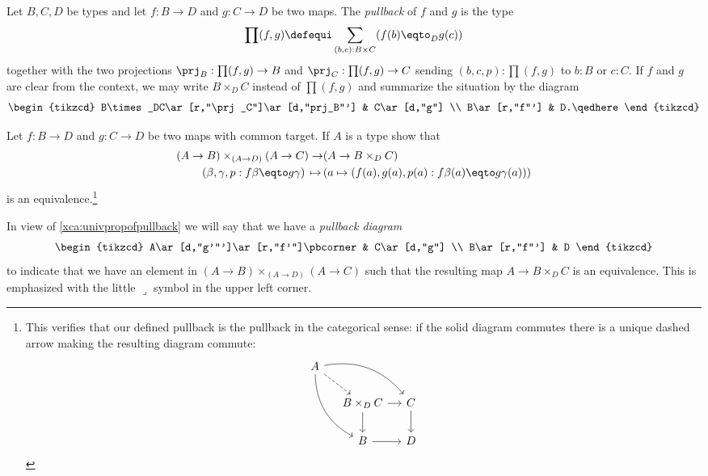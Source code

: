 \begin{definition}
  \label{def:pullback}
  Let $B, C, D$ be types and let $f:B\to D$ and $g:C\to D$ be two maps.
  The \emph{pullback} of $f$ and $g$ is the type
  \[
    \prod(f,g)\defequi\sum_{(b,c):B\times C}(f(b)\eqto_Dg(c))
  \]
  together with the two projections $\prj_B:\prod(f,g)\to B$
  and $\prj_C:\prod(f,g)\to C$ sending $(b,c,p):\prod(f,g)$ to $b:B$ or $c:C$.
  If $f$ and $g$ are clear from the context,
  we may write $B\times_DC$ instead of $\prod(f,g)$ and summarize the situation by the diagram
  \[
    \begin{tikzcd}
      B\times_DC\ar[r,"\prj_C"]\ar[d,"prj_B"'] & C\ar[d,"g"] \\
      B\ar[r,"f"'] & D.\qedhere
    \end{tikzcd}
  \]
\end{definition}
\begin{xca}
  \label{xca:univpropofpullback}
  Let $f:B\to D$ and $g:C\to D$ be two maps with common target.
  If $A$ is a type show that
  \begin{align*}
    (A\to B)\times_{(A\to D)}(A\to C)\to &(A\to B\times_DC)\\
(\beta,\gamma,p:f\beta\eqto g\gamma)\,\mapsto\,&(a\mapsto (f(a),g(a),p(a):f\beta(a)\eqto g\gamma(a)))
  \end{align*}
  is an equivalence.\footnote{This verifies that our defined pullback is the pullback in the categorical sense:
    if the solid diagram commutes there is a unique dashed arrow making the resulting diagram commute:
    \[
      \begin{tikzcd}[ampersand replacement=\&,column sep=small]
        A\ar[dr,dashed]\ar[drr,bend left]\ar[ddr,bend right] \&\& \\
        \& B\times_DC\ar[r]\ar[d] \& C\ar[d] \\
        \& B\ar[r] \& D
      \end{tikzcd}
    \]}
\end{xca}
In view of \cref{xca:univpropofpullback} we will say that we have a \emph{pullback diagram}
\[
  \begin{tikzcd}
    A\ar[d,"g'"']\ar[r,"f'"]\pbcorner & C\ar[d,"g"] \\
    B\ar[r,"f"'] & D
  \end{tikzcd}
\]
to indicate that we have an element in $(A\to B)\times_{(A\to D)}(A\to C)$ such that the resulting map
$A\to B\times_DC$ is an equivalence.
This is emphasized with the little $\lrcorner$ symbol in the upper left corner.

